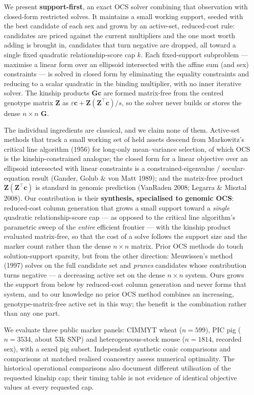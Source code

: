 \documentclass[11pt]{article}
\newcommand{\tp}{^{\top}}
\newcommand{\bc}{\mathbf{c}}
\newcommand{\bG}{\mathbf{G}}
\newcommand{\bZ}{\mathbf{Z}}
\begin{document}
We present \textbf{support-first}, an exact OCS solver combining that observation with closed-form restricted solves. It maintains a small working support, seeded with the best candidate of each sex and grown by an active-set, reduced-cost rule: candidates are priced against the current multipliers and the one most worth adding is brought in, candidates that turn negative are dropped, all toward a single fixed quadratic relationship-score cap $k$. Each fixed-support subproblem --- maximise a linear form over an ellipsoid intersected with the affine sum (and sex) constraints --- is solved in closed form by eliminating the equality constraints and reducing to a scalar quadratic in the binding multiplier, with no inner iterative solver. The kinship products $\bG\bc$ are formed matrix-free from the centred genotype matrix $\bZ$ as $\varepsilon\bc + \bZ(\bZ\tp\bc)/s$, so the solver never builds or stores the dense $n\times n$ $\bG$.

The individual ingredients are classical, and we claim none of them. Active-set methods that track a small working set of held assets descend from Markowitz's critical line algorithm (1956) for long-only mean--variance selection, of which OCS is the kinship-constrained analogue; the closed form for a linear objective over an ellipsoid intersected with linear constraints is a constrained-eigenvalue / secular-equation result (Gander, Golub \& von Matt 1989); and the matrix-free product $\bZ(\bZ\tp\bc)$ is standard in genomic prediction (VanRaden 2008; Legarra \& Misztal 2008). Our contribution is their \textbf{synthesis, specialised to genomic OCS}: reduced-cost column generation that grows a small support toward a \emph{single} quadratic relationship-score cap --- as opposed to the critical line algorithm's parametric sweep of the \emph{entire} efficient frontier --- with the kinship product evaluated matrix-free, so that the cost of a solve follows the support size and the marker count rather than the dense $n\times n$ matrix. Prior OCS methods do touch solution-support sparsity, but from the other direction: Meuwissen's method (1997) solves on the full candidate set and \emph{prunes} candidates whose contribution turns negative --- a decreasing active set on the dense $n\times n$ system. Ours grows the support from below by reduced-cost column generation and never forms that system, and to our knowledge no prior OCS method combines an increasing, genotype-matrix-free active set in this way; the benefit is the combination rather than any one part.

We evaluate three public marker panels: CIMMYT wheat ($n=599$), PIC pig ($n=3534$, about 53k SNP) and heterogeneous-stock mouse ($n=1814$, recorded sex), with a sexed pig subset. Independent synthetic conic comparisons and comparisons at matched realised coancestry assess numerical optimality. The historical operational comparisons also document different utilisation of the requested kinship cap; their timing table is not evidence of identical objective values at every requested cap.
\end{document}

